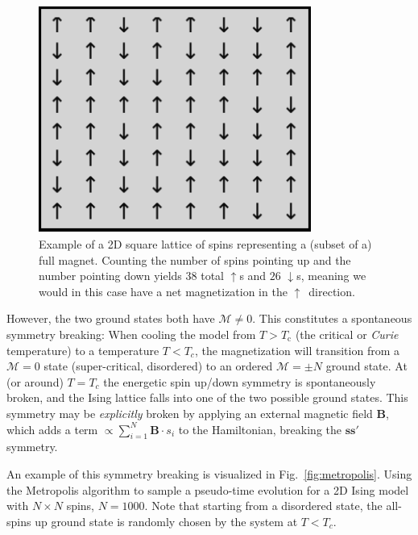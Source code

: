 \documentclass[a4paper, twocolumn]{article}
\newcommand{\fig}[1]{Fig.\ \ref{fig:#1}}
\begin{document}
\begin{figure}
  \centering
  \includegraphics[width=0.8\textwidth]{ising_lattice.pdf}
  \caption{Example of a 2D square lattice of spins representing a (subset of a) full magnet. Counting the number of spins pointing up and the number pointing down yields $38$ total $\uparrow$s and $26$ $\downarrow$s, meaning we would in this case have a net magnetization in the $\uparrow$ direction. \label{fig:ising_lattice}}
\end{figure}

However, the two ground states both have $\mathcal{M}\not=0$. This constitutes a spontaneous symmetry breaking: When cooling the model from $T>T_\text{c}$ (the critical or \textit{Curie} temperature) to a temperature $T<T_c$, the magnetization will transition from a $\mathcal{M}=0$ state (super-critical, disordered) to an ordered $\mathcal{M}=\pm N$ ground state. At (or around) $T=T_c$ the energetic spin up/down symmetry is spontaneously broken, and the Ising lattice falls into one of the two possible ground states. This symmetry may be \textit{explicitly} broken by applying an external magnetic field $\mathbf{B}$, which adds a term $\propto \sum_{i=1}^N \mathbf{B}\cdot s_i$ to the Hamiltonian, breaking the $\mathbf{s}$\ce{<=>}$\mathbf{s}'$ symmetry.

An example of this symmetry breaking is visualized in \fig{metropolis}. Using the Metropolis algorithm to sample a pseudo-time evolution for a 2D Ising model with $N\times N$ spins, $N=1000$. Note that starting from a disordered state, the all-spins up ground state is randomly chosen by the system at $T<T_c$.
\end{document}
